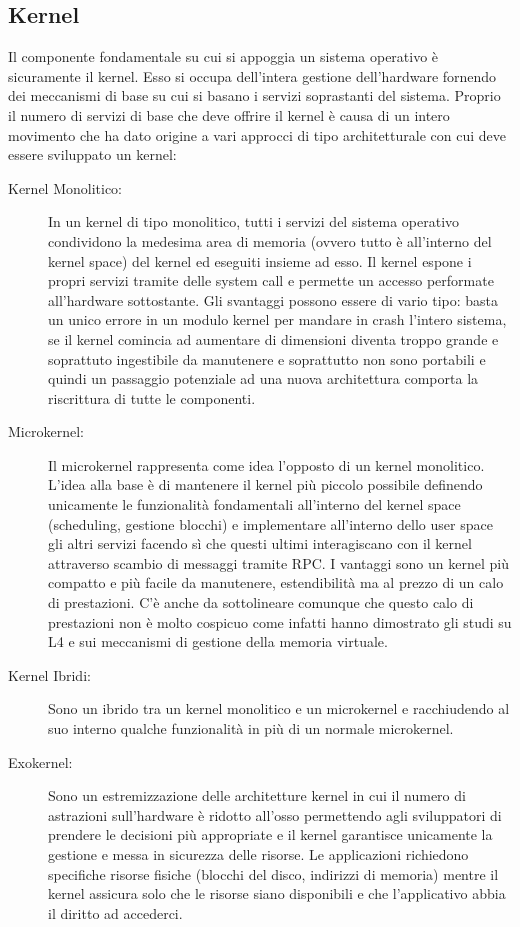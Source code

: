 \subsection{Kernel}
Il componente fondamentale su cui si appoggia un sistema operativo è sicuramente il kernel. Esso si occupa dell'intera gestione dell'hardware fornendo dei meccanismi di base su cui si basano i servizi soprastanti del sistema. Proprio il numero di servizi di base che deve offrire il kernel è causa di un intero movimento che ha dato origine a vari approcci di tipo architetturale con cui deve essere sviluppato un kernel:
\begin{description}
  \item[Kernel Monolitico:] In un kernel di tipo monolitico, tutti i servizi del sistema operativo condividono la medesima area di memoria (ovvero tutto è all'interno del kernel space) del kernel ed eseguiti insieme ad esso. Il kernel espone i propri servizi tramite delle system call e permette un accesso performate all'hardware sottostante. Gli svantaggi possono essere di vario tipo: basta un unico errore in un modulo kernel per mandare in crash l'intero sistema, se il kernel comincia ad aumentare di dimensioni diventa troppo grande e soprattuto ingestibile da manutenere e soprattutto non sono portabili e quindi un passaggio potenziale ad una nuova architettura comporta la riscrittura di tutte le componenti.
  \item[Microkernel:] Il microkernel rappresenta come idea l'opposto di un kernel monolitico. L'idea alla base è di mantenere il kernel più piccolo possibile definendo unicamente le funzionalità fondamentali all'interno del kernel space (scheduling, gestione blocchi) e implementare all'interno dello user space gli altri servizi facendo sì che questi ultimi  interagiscano con il kernel attraverso scambio di messaggi tramite RPC. I vantaggi sono un kernel più compatto e più facile da manutenere, estendibilità ma al prezzo di un calo di prestazioni. C'è anche da sottolineare comunque che questo calo di prestazioni non è molto cospicuo come infatti hanno dimostrato gli studi su L4\cite{hartig97} e sui meccanismi di gestione della memoria virtuale\cite{rashid88,appel91}.
  \item[Kernel Ibridi:] Sono un ibrido tra un kernel monolitico e un microkernel e racchiudendo al suo interno qualche funzionalità in più di un normale microkernel.
  \item[Exokernel:] Sono un estremizzazione delle architetture kernel in cui il numero di astrazioni sull'hardware è ridotto all'osso permettendo agli sviluppatori di prendere le decisioni più appropriate e il kernel garantisce unicamente la gestione e messa in sicurezza delle risorse. Le applicazioni richiedono specifiche risorse fisiche (blocchi del disco, indirizzi di memoria) mentre il kernel assicura solo che le risorse siano disponibili e che l'applicativo abbia il diritto ad accederci.\cite{engler94}
\end{description}
